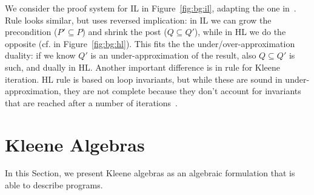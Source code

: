We consider the proof system for IL in Figure~\ref{fig:bg:il}, adapting the one in~\cite{MOH21}.
Rule  looks similar, but uses reversed implication: in IL we can grow the precondition ($P' \subseteq P$) and shrink the post ($Q \subseteq Q'$), while in HL we do the opposite (cf.  in Figure~\ref{fig:bg:hl}). This fits the the under/over-approximation duality: if we know $Q'$ is an under-approximation of the result, also $Q \subseteq Q'$ is such, and dually in HL.
Another important difference is in rule  for Kleene iteration. HL rule  is based on loop invariants, but while these are sound in under-approximation, they are not complete because they don't account for invariants that are reached after a number of iterations~\cite[§4]{OHearn20}.


\section{Kleene Algebras}\label{sec:bg:algebra}
In this Section, we present Kleene algebras as an algebraic formulation that is able to describe programs.

